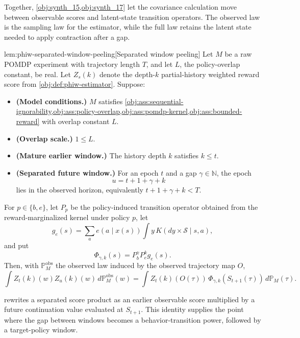 Together, \cref{obj:synth_15,obj:synth_17} let the covariance calculation move between observable scores and latent-state transition operators. The observed law is the sampling law for the estimator, while the full law retains the latent state needed to apply contraction after a gap.

\begin{lemmav}{lem:phiw-separated-window-peeling}[Separated window peeling]
Let \(M\) be a raw POMDP experiment with trajectory length \(T\), and let \(L\), the policy-overlap constant, be real. Let \(Z_s(k)\) denote the depth-\(k\) partial-history weighted reward score from \cref{obj:def:phiw-estimator}. Suppose:
\begin{itemize}
\item \textbf{(Model conditions.)} \(M\) satisfies \cref{obj:ass:sequential-ignorability,obj:ass:policy-overlap,obj:ass:pomdp-kernel,obj:ass:bounded-reward} with overlap constant \(L\).
\item \textbf{(Overlap scale.)} \(1\le L\).
\item \textbf{(Mature earlier window.)} The history depth \(k\) satisfies \(k\le t\).
\item \textbf{(Separated future window.)} For an epoch \(t\) and a gap \(\gamma\in\mathbb N\), the epoch
\[
u=t+1+\gamma+k
\]
lies in the observed horizon, equivalently \(t+1+\gamma+k<T\).
\end{itemize}
For \(p\in\{b,e\}\), let \(P_p\) be the policy-induced transition operator obtained from the reward-marginalized kernel under policy \(p\), let
\[
g_e(s)=\sum_a e(a\mid x(s))\int y\,K(dy\times\mathcal S\mid s,a),
\]
and put
\[
\Phi_{\gamma,k}(s)=P_b^\gamma P_e^k g_e(s).
\]
Then, with \(\mathbb P_M^{\mathrm{obs}}\) the observed law induced by the observed trajectory map \(O\),
\[
\int Z_t(k)(w)Z_u(k)(w)\,d\mathbb P_M^{\mathrm{obs}}(w)
=
\int Z_t(k)(O(\tau))\,\Phi_{\gamma,k}(S_{t+1}(\tau))\,d\mathbb P_M(\tau).
\]
\end{lemmav}

 rewrites a separated score product as an earlier observable score multiplied by a future continuation value evaluated at \(S_{t+1}\). This identity supplies the point where the gap between windows becomes a behavior-transition power, followed by a target-policy window.

